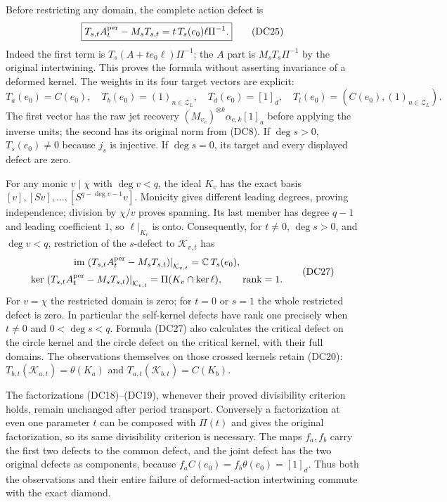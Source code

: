 \documentclass{article}
\begin{document}
Before restricting any domain, the complete action defect is
\[
 \boxed{
 T_{s,t}A_t^{\rm per}-M_sT_{s,t}
       =t\,T_s(e_0)\ell\Pi^{-1}.}
 \tag{DC25}
\]
Indeed the first term is $T_s(A+t e_0\ell)\Pi^{-1}$;
the $A$ part is $M_sT_s\Pi^{-1}$ by the original intertwining.
This proves the formula without asserting invariance of a
deformed kernel.  The weights in its four target vectors are
explicit:
\[
 T_a(e_0)=C(e_0),\quad
 T_b(e_0)=(1)_{n\in\mathcal Z_L},\quad
 T_d(e_0)=[1]_d,\quad
 T_l(e_0)=(C(e_0),(1)_{n\in\mathcal Z_L}).
 \tag{DC26}
\]
The first vector has the raw jet recovery
$(M_{\upsilon_c})^{\otimes k}\alpha_{c,k}[1]_a$ before applying
the inverse units; the second has its original norm from (DC8).
If $\deg s>0$, $T_s(e_0)\ne0$ because $j_s$ is injective.
If $\deg s=0$, its target and every displayed defect are zero.

For any monic $v\mid\chi$ with $\deg v<q$, the ideal $K_v$
has the exact basis
$[v],[Sv],\ldots,[S^{q-\deg v-1}v]$.  Monicity gives different
leading degrees, proving independence; division by $\chi/v$
proves spanning.  Its last member has degree $q-1$ and leading
coefficient $1$, so $\ell|_{K_v}$ is onto.  Consequently, for
$t\ne0$, $\deg s>0$, and $\deg v<q$, restriction of the
$s$-defect to $\mathcal K_{v,t}$ has
\[
 \begin{gathered}
 \operatorname{im}
 \left.(T_{s,t}A_t^{\rm per}-M_sT_{s,t})\right|_{\mathcal K_{v,t}}
      =\mathbb C\,T_s(e_0),\\
 \ker
 \left.(T_{s,t}A_t^{\rm per}-M_sT_{s,t})\right|_{\mathcal K_{v,t}}
      =\Pi(K_v\cap\ker\ell),\qquad
 \operatorname{rank}=1 .
 \end{gathered}
 \tag{DC27}
\]
For $v=\chi$ the restricted domain is zero; for $t=0$ or $s=1$
the whole restricted defect is zero.  In particular the
self-kernel defects have rank one precisely when
$t\ne0$ and $0<\deg s<q$.  Formula (DC27) also calculates the
critical defect on the circle kernel and the circle defect on the
critical kernel, with their full domains.
The observations themselves on those crossed kernels retain
(DC20):
$T_{b,t}(\mathcal K_{a,t})=\theta(K_a)$ and
$T_{a,t}(\mathcal K_{b,t})=C(K_b)$.

The factorizations (DC18)--(DC19), whenever their proved
divisibility criterion holds, remain unchanged after period
transport.  Conversely a factorization at even one parameter
$t$ can be composed with $\Pi(t)$ and gives the original
factorization, so its same divisibility criterion is necessary.
The maps $f_a,f_b$ carry the first two defects to the common
defect, and the joint defect has the two original defects as
components, because $f_aC(e_0)=f_b\theta(e_0)=[1]_d$.
Thus both the observations and their entire failure of
deformed-action intertwining commute with the exact diamond.
\end{document}
